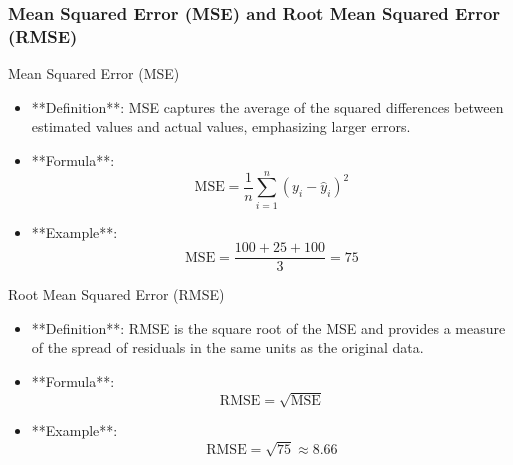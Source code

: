 \documentclass[aspectratio=169]{beamer}
\begin{document}
\begin{frame}[fragile]
    \frametitle{Mean Squared Error (MSE) and Root Mean Squared Error (RMSE)}
    \begin{block}{Mean Squared Error (MSE)}
        \begin{itemize}
            \item **Definition**: MSE captures the average of the squared differences between estimated values and actual values, emphasizing larger errors.
            \item **Formula**:
                \begin{equation}
                \text{MSE} = \frac{1}{n} \sum_{i=1}^{n} (y_i - \hat{y}_i)^2
                \end{equation}
            \item **Example**:
                \begin{equation}
                \text{MSE} = \frac{100 + 25 + 100}{3} = 75
                \end{equation}
        \end{itemize}
    \end{block}
    
    \begin{block}{Root Mean Squared Error (RMSE)}
        \begin{itemize}
            \item **Definition**: RMSE is the square root of the MSE and provides a measure of the spread of residuals in the same units as the original data.
            \item **Formula**:
                \begin{equation}
                \text{RMSE} = \sqrt{\text{MSE}}
                \end{equation}
            \item **Example**:
                \begin{equation}
                \text{RMSE} = \sqrt{75} \approx 8.66
                \end{equation}
        \end{itemize}
    \end{block}
\end{frame}
\end{document}
